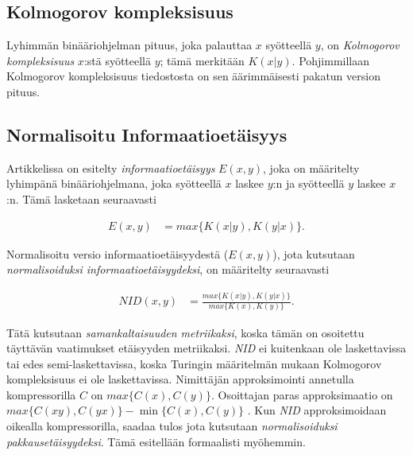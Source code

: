 \documentclass[11pt,finnish]{tktltiki2}
\theoremstyle{definition}
\theoremstyle{remark}
\begin{document}
  \subsection{Kolmogorov kompleksisuus} %
\label{sub:kolmogorov_kompleksisuus}

  Lyhimmän binääriohjelman pituus, joka palauttaa $x$ syötteellä $y$, on \emph{Kolmogorov kompleksisuus} $x$:stä syötteellä $y$; tämä merkitään $K(x|y)$. Pohjimmillaan Kolmogorov kompleksisuus tiedostosta on sen äärimmäisesti pakatun version pituus.

\subsection{Normalisoitu Informaatioetäisyys} %
\label{sub:normalisoitu_informaatioet_isyys}

  Artikkelissa \cite{CV05} on esitelty \emph{informaatioetäisyys} $E(x,y)$, joka on määritelty lyhimpänä binääriohjelmana, joka syötteellä $x$ laskee $y$:n ja syötteellä $y$ laskee $x$:n. Tämä lasketaan seuraavasti \cite{10.1109/WDM.2004.1358107}

  \begin{align}
    E(x,y) &= max\{K(x|y),K(y|x)\}.
  \end{align}

  Normalisoitu versio informaatioetäisyydestä ($E(x,y)$), jota kutsutaan \emph{normalisoiduksi informaatioetäisyydeksi}, on määritelty seuraavasti

  \begin{align}
    NID(x,y) &= \frac{ max\{K{(x|y)},K{(y|x)}\} }{ max \{K(x),K(y)\}}.
  \end{align}

  Tätä kutsutaan \emph{samankaltaisuuden metriikaksi}, koska tämän on osoitettu \cite{CV05} täyttävän vaatimukset etäisyyden metriikaksi. \emph{NID} ei kuitenkaan ole laskettavissa tai edes semi-laskettavissa, koska Turingin määritelmän mukaan Kolmogorov kompleksisuus ei ole laskettavissa.
  Nimittäjän approksimointi annetulla kompressorilla $C$ on $max \{C(x),C(y)\}$. Osoittajan paras approksimaatio on $max\{C(xy),C(yx)\} - \min\{C(x),C(y)\}$ \cite{CV05}.
  Kun \emph{NID} approksimoidaan oikealla kompressorilla, saadaa tulos jota kutsutaan \emph{normalisoiduksi pakkausetäisyydeksi}. Tämä esitellään formaalisti myöhemmin.
\end{document}
